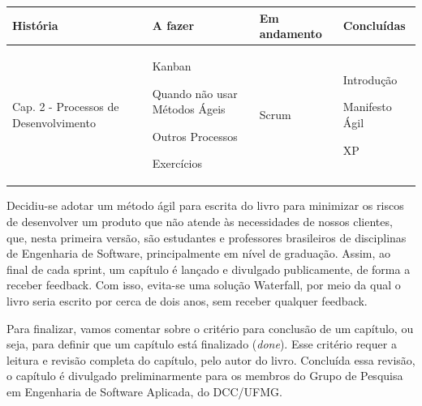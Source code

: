 \documentclass[
  11pt,
  twoside]{book}
\begin{document}
\begin{longtable}[]{@{}llll@{}}
\toprule
\begin{minipage}[b]{0.22\columnwidth}\raggedright
\textbf{História}\strut
\end{minipage} & \begin{minipage}[b]{0.21\columnwidth}\raggedright
\textbf{A fazer}\strut
\end{minipage} & \begin{minipage}[b]{0.21\columnwidth}\raggedright
\textbf{Em andamento}\strut
\end{minipage} & \begin{minipage}[b]{0.21\columnwidth}\raggedright
\textbf{Concluídas}\strut
\end{minipage}\tabularnewline
\midrule
\endhead
\begin{minipage}[t]{0.22\columnwidth}\raggedright
Cap. 2 - Processos de Desenvolvimento\strut
\end{minipage} & \begin{minipage}[t]{0.21\columnwidth}\raggedright
Kanban

Quando não usar Métodos Ágeis

Outros Processos

Exercícios\strut
\end{minipage} & \begin{minipage}[t]{0.21\columnwidth}\raggedright
Scrum\strut
\end{minipage} & \begin{minipage}[t]{0.21\columnwidth}\raggedright
Introdução

Manifesto Ágil

XP\strut
\end{minipage}\tabularnewline
\bottomrule
\end{longtable}

Decidiu-se adotar um método ágil para escrita do livro para minimizar os
riscos de desenvolver um produto que não atende às necessidades de
nossos clientes, que, nesta primeira versão, são estudantes e
professores brasileiros de disciplinas de Engenharia de Software,
principalmente em nível de graduação. Assim, ao final de cada sprint, um
capítulo é lançado e divulgado publicamente, de forma a receber
feedback. Com isso, evita-se uma solução Waterfall, por meio da qual o
livro seria escrito por cerca de dois anos, sem receber qualquer
feedback.

Para finalizar, vamos comentar sobre o critério para conclusão de um
capítulo, ou seja, para definir que um capítulo está finalizado
(\emph{done}). Esse critério requer a leitura e revisão completa do
capítulo, pelo autor do livro. Concluída essa revisão, o capítulo é
divulgado preliminarmente para os membros do Grupo de Pesquisa em
Engenharia de Software Aplicada, do DCC/UFMG.
\end{document}
